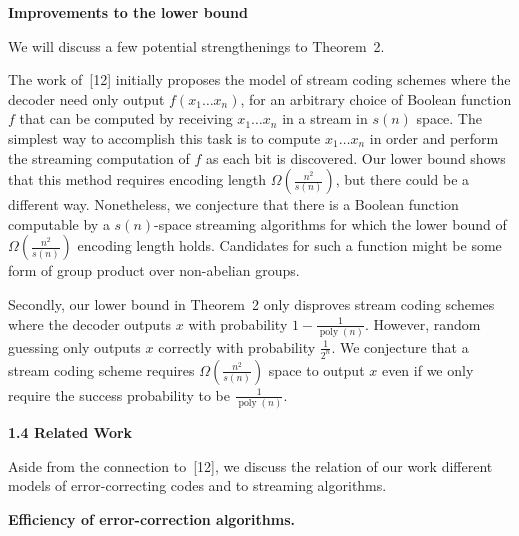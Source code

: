 \par\medskip\noindent\textbf{Improvements to the lower bound}\par




We will discuss a few potential strengthenings to Theorem 2.\par




The work of [12] initially proposes the model of stream coding schemes where the decoder need only output $f(x_{1}\ldots x_{n})$, for an arbitrary choice of Boolean function $f$ that can be computed by receiving $x_{1}\ldots x_{n}$ in a stream in $s(n)$ space. The simplest way to accomplish this task is to compute $x_{1}\ldots x_{n}$ in order and perform the streaming computation of $f$ as each bit is discovered. Our lower bound shows that this method requires encoding length $\Omega\left(\frac{n^{2}}{s(n)}\right)$, but there could be a different way. Nonetheless, we conjecture that there is a Boolean function computable by a $s(n)$-space streaming algorithms for which the lower bound of $\Omega\left(\frac{n^{2}}{s(n)}\right)$ encoding length holds. Candidates for such a function might be some form of group product over non-abelian groups.\par




Secondly, our lower bound in Theorem 2 only disproves stream coding schemes where the decoder outputs $x$ with probability $1-\frac{1}{\operatorname{poly}(n)}$. However, random guessing only outputs $x$ correctly with probability $\frac{1}{2^{n}}$. We conjecture that a stream coding scheme requires $\Omega\left(\frac{n^{2}}{s(n)}\right)$ space to output $x$ even if we only require the success probability to be $\frac{1}{\operatorname{poly}(n)}$.\par






\par\medskip\noindent\textbf{
1.4 Related Work}\par




Aside from the connection to [12], we discuss the relation of our work different models of error-correcting codes and to streaming algorithms.\par




\par\medskip\noindent\textbf{Efficiency of error-correction algorithms.}\par




